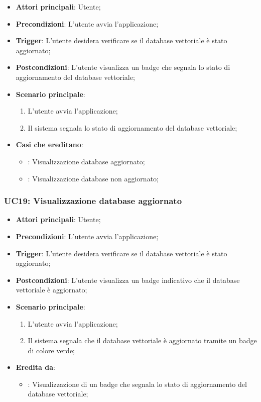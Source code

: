 \begin{itemize}
    \item \textbf{Attori principali}: Utente;
    \item \textbf{Precondizioni}: L'utente avvia l'applicazione;
    \item \textbf{Trigger}: L'utente desidera verificare se il database vettoriale è stato aggiornato;
    \item \textbf{Postcondizioni}: L'utente visualizza un badge che segnala lo stato di aggiornamento del database vettoriale;
    \item \textbf{Scenario principale}:
    \begin{enumerate}
        \item L'utente avvia l'applicazione;
        \item Il sistema segnala lo stato di aggiornamento del database vettoriale;
    \end{enumerate}
    \item \textbf{Casi che ereditano}:
    \begin{itemize}
        \item {}: Visualizzazione database aggiornato;
        \item {}: Visualizzazione database non aggiornato;
    \end{itemize}
\end{itemize}

\hypertarget{UC19}{}
\subsubsection{UC19: Visualizzazione database aggiornato}
\begin{itemize}
    \item \textbf{Attori principali}: Utente;
    \item \textbf{Precondizioni}: L'utente avvia l'applicazione;
    \item \textbf{Trigger}: L'utente desidera verificare se il database vettoriale è stato aggiornato;
    \item \textbf{Postcondizioni}: L'utente visualizza un badge indicativo che il database vettoriale è aggiornato;
    \item \textbf{Scenario principale}:
    \begin{enumerate}
        \item L'utente avvia l'applicazione;
        \item Il sistema segnala che il database vettoriale è aggiornato tramite un badge di colore verde;
    \end{enumerate}
    \item \textbf{Eredita da}:
    \begin{itemize}
        \item {}: Visualizzazione di un badge che segnala lo stato di aggiornamento del database vettoriale;
    \end{itemize}
\end{itemize}

